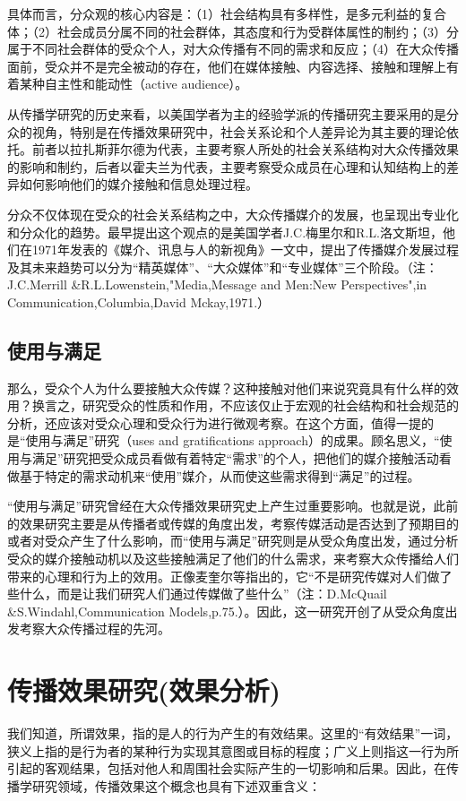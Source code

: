 \documentclass[UTF8,12pt]{ctexart}
\numberwithin{equation}{section} %
\numberwithin{figure}{section}
\numberwithin{table}{section}
\begin{document}
	具体而言，分众观的核心内容是：（1）社会结构具有多样性，是多元利益的复合体；（2）社会成员分属不同的社会群体，其态度和行为受群体属性的制约；（3）分属于不同社会群体的受众个人，对大众传播有不同的需求和反应；（4）在大众传播面前，受众并不是完全被动的存在，他们在媒体接触、内容选择、接触和理解上有着某种自主性和能动性（active audience）。
	
	从传播学研究的历史来看，以美国学者为主的经验学派的传播研究主要采用的是分众的视角，特别是在传播效果研究中，社会关系论和个人差异论为其主要的理论依托。前者以拉扎斯菲尔德为代表，主要考察人所处的社会关系结构对大众传播效果的影响和制约，后者以霍夫兰为代表，主要考察受众成员在心理和认知结构上的差异如何影响他们的媒介接触和信息处理过程。
	
	分众不仅体现在受众的社会关系结构之中，大众传播媒介的发展，也呈现出专业化和分众化的趋势。最早提出这个观点的是美国学者J.C.梅里尔和R.L.洛文斯坦，他们在1971年发表的《媒介、讯息与人的新视角》一文中，提出了传播媒介发展过程及其未来趋势可以分为“精英媒体”、“大众媒体”和“专业媒体”三个阶段。（注：J.C.Merrill \&R.L.Lowenstein,"Media,Message and Men:New Perspectives",in Communication,Columbia,David Mckay,1971.）
	
	\subsection{使用与满足}
	
	那么，受众个人为什么要接触大众传媒？这种接触对他们来说究竟具有什么样的效用？换言之，研究受众的性质和作用，不应该仅止于宏观的社会结构和社会规范的分析，还应该对受众心理和受众行为进行微观考察。在这个方面，值得一提的是“使用与满足”研究（uses and gratifications approach）的成果。顾名思义，“使用与满足”研究把受众成员看做有着特定“需求”的个人，把他们的媒介接触活动看做基于特定的需求动机来“使用”媒介，从而使这些需求得到“满足”的过程。
	
	“使用与满足”研究曾经在大众传播效果研究史上产生过重要影响。也就是说，此前的效果研究主要是从传播者或传媒的角度出发，考察传媒活动是否达到了预期目的或者对受众产生了什么影响，而“使用与满足”研究则是从受众角度出发，通过分析受众的媒介接触动机以及这些接触满足了他们的什么需求，来考察大众传播给人们带来的心理和行为上的效用。正像麦奎尔等指出的，它“不是研究传媒对人们做了些什么，而是让我们研究人们通过传媒做了些什么”（注：D.McQuail \&S.Windahl,Communication Models,p.75.）。因此，这一研究开创了从受众角度出发考察大众传播过程的先河。
	
	\newpage
	
	\section{传播效果研究(效果分析)}
	我们知道，所谓效果，指的是人的行为产生的有效结果。这里的“有效结果”一词，狭义上指的是行为者的某种行为实现其意图或目标的程度；广义上则指这一行为所引起的客观结果，包括对他人和周围社会实际产生的一切影响和后果。因此，在传播学研究领域，传播效果这个概念也具有下述双重含义：
	
\end{document}
